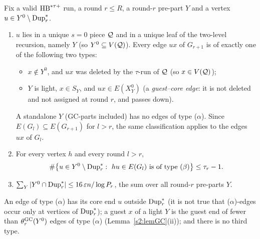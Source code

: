 \begin{proposition}\label{s2:propOrigin}
Fix a valid $\mathrm{HB}^{*\tau{+}}$ run, a round $r\le R$, a round-$r$ pre-part $Y$ and a
vertex $u\in Y^0\setminus\mathrm{Dup}^{*}_r$.
\begin{enumerate}
\item[(a)] $u$ lies in a unique $s=0$ piece $\mathcal{Q}$ and in a unique leaf of the
two-level recursion, namely $Y$ (so $Y^0\subseteq V(\mathcal{Q})$). Every edge $ux$
of $G_{r+1}$ is of exactly one of the following two types:
\begin{itemize}
\item[($\beta$)] $x\notin Y^0$, and $ux$ was deleted by the $\tau$-run of
$\mathcal{Q}$ (so $x\in V(\mathcal{Q})$);
\item[($\alpha$)] $Y$ is light, $x\in S_Y$, and $ux\in E(X^0_Y)$ (a
\emph{guest--core edge}: it is not deleted and not assigned at round $r$, and
passes down).
\end{itemize}
A standalone $Y$ (GC-parts included) has no edges of type ($\alpha$). Since
$E(G_l)\subseteq E(G_{r+1})$ for $l>r$, the same classification applies to the
edges $ux$ of $G_l$.
\item[(b)] For every vertex $h$ and every round $l>r$,
\[
\#\bigl\{u\in Y^0\setminus\mathrm{Dup}^{*}_r:\ hu\in E(G_l)\text{ is of type }(\beta)
\bigr\}\le\tau_r-1.
\]
\item[(c)] $\sum_Y|Y^0\cap\mathrm{Dup}^{*}_r|\le16\,\varepsilon n/\log P_r$, the sum over all
round-$r$ pre-parts $Y$.
\end{enumerate}
An edge of type ($\alpha$) has its core end $u$ outside $\mathrm{Dup}^{*}_r$ (it is not
true that ($\alpha$)-edges occur only at vertices of $\mathrm{Dup}^{*}_r$); a guest $x$
of a light $Y$ is the guest end of fewer than $\theta^{\mathrm{GC}}_r(Y^0)$ edges of type
($\alpha$) (Lemma~\ref{s2:lemGC}(ii)); and there is no third type.
\deps{\ref{s2:lemThinCut}, \ref{s2:lemSEP}, \ref{s2:lemCap}, \ref{s2:propOV}, \ref{s2:lemEL}, \ref{s2:defHBtp}, \ref{s2:lemGC}, \ref{s2:lemOVgeneric}, \ref{s2:propStructure}}
\end{proposition}

